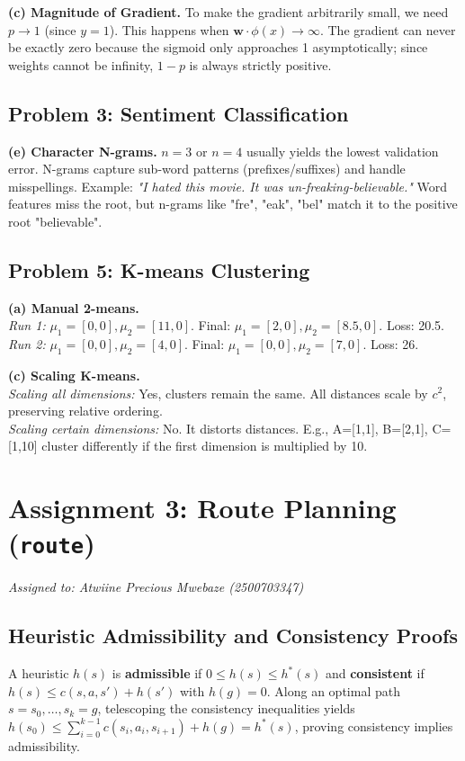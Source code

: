 \documentclass[11pt,a4paper]{article}
\begin{document}
\medskip
\noindent\textbf{(c) Magnitude of Gradient.} To make the gradient arbitrarily small, we need \(p \to 1\) (since \(y=1\)). This happens when \(\mathbf{w} \cdot \phi(x) \to \infty\). The gradient can never be exactly zero because the sigmoid only approaches 1 asymptotically; since weights cannot be infinity, \(1-p\) is always strictly positive.

\subsection{Problem 3: Sentiment Classification}
\textbf{(e) Character N-grams.} \(n=3\) or \(n=4\) usually yields the lowest validation error. N-grams capture sub-word patterns (prefixes/suffixes) and handle misspellings. Example: \textit{"I hated this movie. It was un-freaking-believable."} Word features miss the root, but n-grams like "fre", "eak", "bel" match it to the positive root "believable".

\subsection{Problem 5: K-means Clustering}
\textbf{(a) Manual 2-means.} \\
\textit{Run 1:} \(\mu_1=[0,0], \mu_2=[11,0]\). Final: \(\mu_1=[2,0], \mu_2=[8.5,0]\). Loss: 20.5. \\
\textit{Run 2:} \(\mu_1=[0,0], \mu_2=[4,0]\). Final: \(\mu_1=[0,0], \mu_2=[7,0]\). Loss: 26.

\medskip
\noindent\textbf{(c) Scaling K-means.} \\
\textit{Scaling all dimensions:} Yes, clusters remain the same. All distances scale by \(c^2\), preserving relative ordering. \\
\textit{Scaling certain dimensions:} No. It distorts distances. E.g., A=[1,1], B=[2,1], C=[1,10] cluster differently if the first dimension is multiplied by 10.

\section{Assignment 3: Route Planning (\texttt{route})}
\textit{Assigned to: Atwiine Precious Mwebaze (2500703347)}

\subsection{Heuristic Admissibility and Consistency Proofs}
A heuristic $h(s)$ is \textbf{admissible} if $0 \le h(s) \le h^*(s)$ and \textbf{consistent} if $h(s) \le c(s, a, s') + h(s')$ with $h(g)=0$. Along an optimal path $s = s_0, \dots, s_k = g$, telescoping the consistency inequalities yields $h(s_0) \le \sum_{i=0}^{k-1} c(s_i, a_i, s_{i+1}) + h(g) = h^*(s)$, proving consistency implies admissibility.
\end{document}
